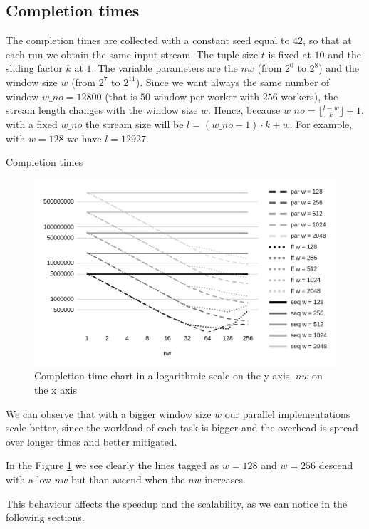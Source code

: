 \subsection{Completion times}
The completion times are collected with a constant seed equal to $42$, so that at each run we obtain the same input stream. The tuple size $t$ is fixed at $10$ and the sliding factor $k$ at $1$. The variable parameters are the $nw$ (from $2^0$ to $2^8$) and the window size $w$ (from $2^7$ to $2^{11}$). Since we want always the same number of window $w\_no = 12800$ (that is $50$ window per worker with $256$ workers), the stream length changes with the window size $w$. Hence, because $w\_no = \lfloor\frac{l-w}{k}\rfloor+1$, with a fixed $w\_no$ the stream size will be $l = (w\_no - 1) \cdot k + w$. For example, with $w = 128$ we have $l = 12927$.

\begin{table}[H]
    \centering
    
    \bigskip
    \caption{Completion times}
    \label{tab:time_table}
\end{table}

\begin{figure}[H]
    \centering
    \includegraphics[width=.7\linewidth]{assets/completion_time}
    \bigskip
    \caption{Completion time chart in a logarithmic scale on the y axis, $nw$ on the x axis}
    \label{fig:completion_time}
\end{figure}

\noindent
We can observe that with a bigger window size $w$ our parallel implementations scale better, since the workload of each task is bigger and the overhead is spread over longer times and better mitigated.

In the Figure \ref{fig:completion_time} we see clearly the lines tagged as $w = 128$ and $w = 256$ descend with a low $nw$ but than ascend when the $nw$ increases.

This behaviour affects the speedup and the scalability, as we can notice in the following sections.

